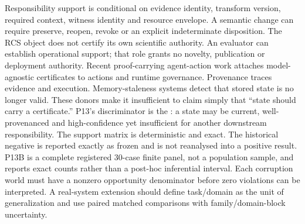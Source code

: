 \markdownRendererDocumentBegin
\markdownRendererSectionBegin
{}\markdownRendererInterblockSeparator
{}Responsibility support is conditional on evidence identity, transform version, required context, witness identity and resource envelope. A semantic change can require preserve, reopen, revoke or an explicit indeterminate disposition. The RCS object does not certify its own scientific authority. An evaluator can establish operational support; that role grants no novelty, publication or deployment authority.\markdownRendererInterblockSeparator
{}Recent proof-carrying agent-action work attaches model-agnostic certificates to actions and runtime governance. Provenance traces evidence and execution. Memory-staleness systems detect that stored state is no longer valid. These donors make it insufficient to claim simply that “state should carry a certificate.” P13's discriminator is the : a state may be current, well-provenanced and high-confidence yet insufficient for another downstream responsibility.\markdownRendererInterblockSeparator
{}The support matrix is deterministic and exact. The historical negative is reported exactly as frozen and is not reanalysed into a positive result. P13B is a complete registered 30-case finite panel, not a population sample, and reports exact counts rather than a post-hoc inferential interval. Each corruption world must have a nonzero opportunity denominator before zero violations can be interpreted. A real-system extension should define task/domain as the unit of generalization and use paired matched comparisons with family/domain-block uncertainty.
\markdownRendererSectionEnd \markdownRendererDocumentEnd